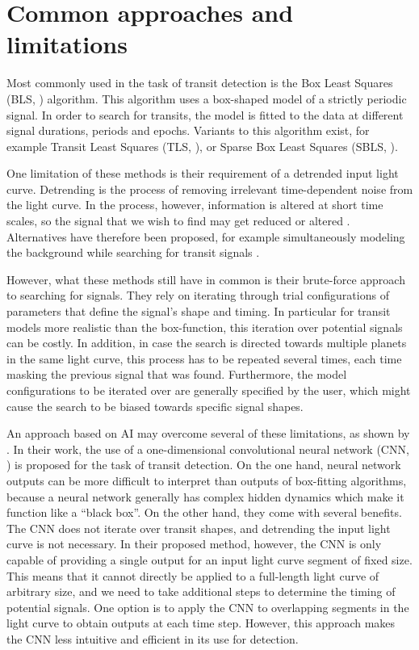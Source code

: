 
\section{Common approaches and limitations}
\label{sec:approaches}

Most commonly used in the task of transit detection is the Box Least Squares (BLS, \citealp{kovacs2002box}) algorithm. This algorithm uses a box-shaped model of a strictly periodic signal. In order to search for transits, the model is fitted to the data at different signal durations, periods and epochs. Variants to this algorithm exist, for example Transit Least Squares (TLS, \citealp{hippke2019optimized}), or Sparse Box Least Squares (SBLS, \citealp{panahi2021sparse}).

One limitation of these methods is their requirement of a detrended input light curve. Detrending is the process of removing irrelevant time-dependent noise from the light curve. In the process, however, information is altered at short time scales, so the signal that we wish to find may get reduced or altered \citep{hippke2019wotan}.  Alternatives have therefore been proposed, for example simultaneously modeling the background while searching for transit signals \citep{foreman2015systematic}.

However, what these methods still have in common is their brute-force approach to searching for signals. 
They rely on iterating through trial configurations of parameters that define the signal's shape and timing. In particular for transit models more realistic than the box-function, this iteration over potential signals can be costly. In addition, in case the search is directed towards multiple planets in the same light curve, this process has to be repeated several times, each time masking the previous signal that was found. Furthermore, the model configurations to be iterated over are generally specified by the user, which might cause the search to be biased towards specific signal shapes.

An approach based on AI may overcome several of these limitations, as shown by \cite{pearson2018searching}. In their work, the use of a one-dimensional convolutional neural network (CNN, \citealp{lecun1989backpropagation}) is proposed for the task of transit detection. On the one hand, neural network outputs can be more difficult to interpret than outputs of box-fitting algorithms, because a neural network generally has complex hidden dynamics which make it function like a ``black box''. On the other hand, they come with several benefits. The CNN does not iterate over transit shapes, and detrending the input light curve is not necessary. 
In their proposed method, however, the CNN is only capable of providing a single output for an input light curve segment of fixed size. 
This means that it cannot directly be applied to a full-length light curve of arbitrary size, and we need to take additional steps to determine the timing of potential signals. One option is to apply the CNN to overlapping segments in the light curve to obtain outputs at each time step. However, this approach makes the CNN less intuitive and efficient in its use for detection. 

